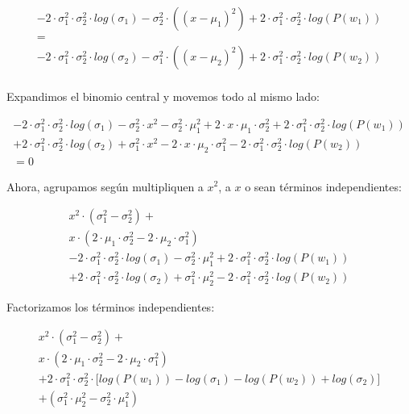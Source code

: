 \documentclass[11pt]{scrartcl}
\begin{document}
\begin{gather*}
  - 2 \cdot \sigma_1^2 \cdot \sigma_2^2 \cdot log(\sigma_1) - \sigma_2^2 \cdot ((x-\mu_1)^2) + 2 \cdot \sigma_1^2 \cdot \sigma_2^2 \cdot log(P(w_1)) \\
  = \\
  - 2 \cdot \sigma_1^2 \cdot \sigma_2^2 \cdot log(\sigma_2) - \sigma_1^2 \cdot ((x-\mu_2)^2) + 2 \cdot \sigma_1^2 \cdot \sigma_2^2 \cdot log(P(w_2)) \\
\end{gather*}

Expandimos el binomio central y movemos todo al mismo lado:

\begin{gather*}
  - 2 \cdot \sigma_1^2 \cdot \sigma_2^2 \cdot log(\sigma_1)
  - \sigma_2^2 \cdot x^2 - \sigma_2^2 \cdot \mu_1^2 + 2 \cdot x \cdot \mu_1 \cdot \sigma_2^2 
  + 2 \cdot \sigma_1^2 \cdot \sigma_2^2 \cdot log(P(w_1)) \\
  + 2 \cdot \sigma_1^2 \cdot \sigma_2^2 \cdot log(\sigma_2) 
  + \sigma_1^2 \cdot x^2  - 2 \cdot x \cdot \mu_2 \cdot \sigma_1^2
  - 2 \cdot \sigma_1^2 \cdot \sigma_2^2 \cdot log(P(w_2)) \\
  = 0
\end{gather*}

Ahora, agrupamos según multipliquen a $x^2$, a $x$ o sean términos independientes:

\begin{gather*}
  x^2 \cdot (\sigma_1^2 - \sigma_2^2) + \\
  x   \cdot (2 \cdot \mu_1 \cdot \sigma_2^2  - 2 \cdot \mu_2 \cdot \sigma_1^2) \\
  - 2 \cdot \sigma_1^2 \cdot \sigma_2^2 \cdot log(\sigma_1) - \sigma_2^2 \cdot \mu_1^2 + 2 \cdot \sigma_1^2 \cdot \sigma_2^2 \cdot log(P(w_1)) \\
  + 2 \cdot \sigma_1^2 \cdot \sigma_2^2 \cdot log(\sigma_2) + \sigma_1^2 \cdot \mu_2^2 - 2 \cdot \sigma_1^2 \cdot \sigma_2^2 \cdot log(P(w_2))
\end{gather*}

Factorizamos los términos independientes:

\begin{gather*}
  x^2 \cdot (\sigma_1^2 - \sigma_2^2) + \\
  x   \cdot (2 \cdot \mu_1 \cdot \sigma_2^2  - 2 \cdot \mu_2 \cdot \sigma_1^2) \\
  + 2 \cdot \sigma_1^2 \cdot \sigma_2^2 \cdot \Big[ log(P(w_1)) - log(\sigma_1) - log(P(w_2)) + log(\sigma_2) \Big] \\
  + (\sigma_1^2 \cdot \mu_2^2 - \sigma_2^2 \cdot \mu_1^2)
\end{gather*}
\end{document}
